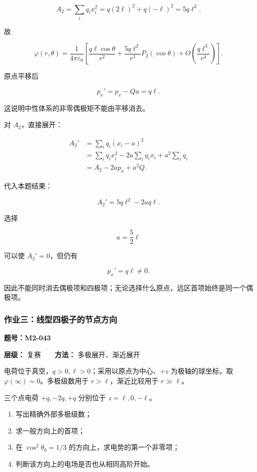 \[
A_2
=\sum_iq_ix_i^2
=q(2\ell)^2+q(-\ell)^2
=5q\ell^2.
\]

故

\[
\boxed{
\varphi(r,\theta)
=\frac{1}{4\pi\varepsilon_0}
\left[
\frac{q\ell\cos\theta}{r^2}
+\frac{5q\ell^2}{r^3}P_2(\cos\theta)
+O\!\left(\frac{q\ell^3}{r^4}\right)
\right]
}.
\]

原点平移后

\[
p_x'=p_x-Qa=q\ell.
\]

这说明中性体系的非零偶极矩不能由平移消去。

对 \(A_2\)，直接展开：

\[
\begin{aligned}
A_2'
&=\sum_iq_i(x_i-a)^2\\
&=\sum_iq_ix_i^2-2a\sum_iq_ix_i+a^2\sum_iq_i\\
&=A_2-2ap_x+a^2Q.
\end{aligned}
\]

代入本题结果：

\[
\boxed{A_2'=5q\ell^2-2aq\ell}.
\]

选择

\[
a=\frac52\ell
\]

可以使 \(A_2'=0\)，但仍有

\[
p_x'=q\ell\ne0.
\]

因此不能同时消去偶极项和四极项；无论选择什么原点，远区首项始终是同一个偶极项。

\subsubsection{作业三：线型四极子的节点方向}\label{m2:ux4f5cux4e1aux4e09ux7ebfux578bux56dbux6781ux5b50ux7684ux8282ux70b9ux65b9ux5411}

\textbf{题号：M2-043}

\textbf{层级：} 复赛　　\textbf{方法：} 多极展开、渐近展开

电荷位于真空，\(q>0,\ell>0\)；采用以原点为中心、\(+z\)
为极轴的球坐标，取 \(\varphi(\infty)=0\)。多极级数用于
\(r>\ell\)，渐近比较用于 \(r\gg\ell\)。

三个点电荷 \(+q,-2q,+q\) 分别位于 \(z=\ell,0,-\ell\)。

\begin{enumerate}
\def\labelenumi{\arabic{enumi}.}
\tightlist
\item
  写出精确外部多极级数；
\item
  求一般方向上的首项；
\item
  在 \(\cos^2\theta_0=1/3\) 的方向上，求电势的第一个非零项；
\item
  判断该方向上的电场是否也从相同高阶开始。
\end{enumerate}

